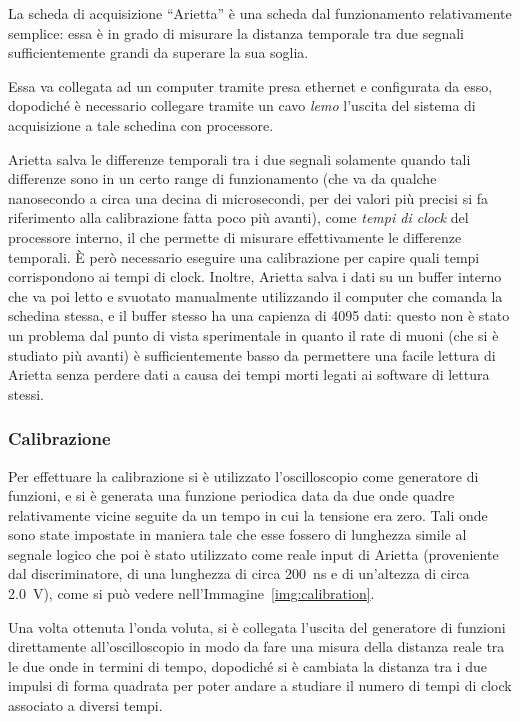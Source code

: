 La scheda di acquisizione ``Arietta'' è una scheda dal funzionamento relativamente semplice: essa è in grado di misurare la distanza temporale tra due segnali sufficientemente grandi da superare la sua soglia.

Essa va collegata ad un computer tramite presa ethernet e configurata da esso, dopodiché è necessario collegare tramite un cavo \textit{lemo} l'uscita del sistema di acquisizione a tale schedina con processore.

Arietta salva le differenze temporali tra i due segnali solamente quando tali differenze sono in un certo range di funzionamento (che va da qualche nanosecondo a circa una decina di microsecondi, per dei valori più precisi si fa riferimento alla calibrazione fatta poco più avanti), come \textit{tempi di clock} del processore interno, il che permette di misurare effettivamente le differenze temporali. 
\`E però necessario eseguire una calibrazione per capire quali tempi corrispondono ai tempi di clock. 
Inoltre, Arietta salva i dati su un buffer interno che va poi letto e svuotato manualmente utilizzando il computer che comanda la schedina stessa, e il buffer stesso ha una capienza di 4095 dati: questo non è stato un problema dal punto di vista sperimentale in quanto il rate di muoni (che si è studiato più avanti) è sufficientemente basso da permettere una facile lettura di Arietta senza perdere dati a causa dei tempi morti legati ai software di lettura stessi.\\

\subsubsection{Calibrazione}
Per effettuare la calibrazione si è utilizzato l'oscilloscopio come generatore di funzioni, e si è generata una funzione periodica data da due onde quadre relativamente vicine seguite da un tempo in cui la tensione era zero. 
Tali onde sono state impostate in maniera tale che esse fossero di lunghezza simile al segnale logico che poi è stato utilizzato come reale input di Arietta (proveniente dal discriminatore, di una lunghezza di circa \SI{200}{\ns} e di un'altezza di circa \SI{2.0}{\V}), come si può vedere nell'Immagine~\ref{img:calibration}.\\

Una volta ottenuta l'onda voluta, si è collegata l'uscita del generatore di funzioni direttamente all'oscilloscopio in modo da fare una misura della distanza reale tra le due onde in termini di tempo, dopodiché si è cambiata la distanza tra i due impulsi di forma quadrata per poter andare a studiare il numero di tempi di clock associato a diversi tempi.

